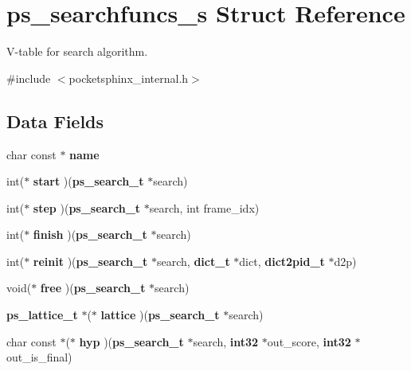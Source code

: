 \section{ps\-\_\-searchfuncs\-\_\-s \-Struct \-Reference}
\label{structps__searchfuncs__s}


\-V-\/table for search algorithm.  




{\ttfamily \#include $<$pocketsphinx\-\_\-internal.\-h$>$}

\subsection*{\-Data \-Fields}
\begin{DoxyCompactItemize}
\item 
char const $\ast$ {\bfseries name}\label{structps__searchfuncs__s_a0a227b1bbc134ced7d7980bc873d39d6}

\item 
int($\ast$ {\bfseries start} )({\bf ps\-\_\-search\-\_\-t} $\ast$search)\label{structps__searchfuncs__s_a74ab853abe9f12ce016c5e92e10f0fe2}

\item 
int($\ast$ {\bfseries step} )({\bf ps\-\_\-search\-\_\-t} $\ast$search, int frame\-\_\-idx)\label{structps__searchfuncs__s_a7c92cba8683e766c1d4988118fc883f7}

\item 
int($\ast$ {\bfseries finish} )({\bf ps\-\_\-search\-\_\-t} $\ast$search)\label{structps__searchfuncs__s_a20a8de3b54011ce526e1a80ad42bb7c4}

\item 
int($\ast$ {\bfseries reinit} )({\bf ps\-\_\-search\-\_\-t} $\ast$search, {\bf dict\-\_\-t} $\ast$dict, {\bf dict2pid\-\_\-t} $\ast$d2p)\label{structps__searchfuncs__s_ac72f755ca7e66ee559a117982cf1a374}

\item 
void($\ast$ {\bfseries free} )({\bf ps\-\_\-search\-\_\-t} $\ast$search)\label{structps__searchfuncs__s_ad1f76bab9eede4b2fd1dd0e65bd6c60b}

\item 
{\bf ps\-\_\-lattice\-\_\-t} $\ast$($\ast$ {\bfseries lattice} )({\bf ps\-\_\-search\-\_\-t} $\ast$search)\label{structps__searchfuncs__s_aeaeebdd2e5852aef04a25eb2291139e1}

\item 
char const $\ast$($\ast$ {\bfseries hyp} )({\bf ps\-\_\-search\-\_\-t} $\ast$search, {\bf int32} $\ast$out\-\_\-score, {\bf int32} $\ast$out\-\_\-is\-\_\-final)\label{structps__searchfuncs__s_ab35d758b994ad40cc693d1015552c3a2}


\end{DoxyCompactItemize}
